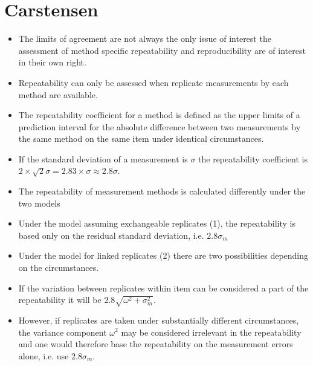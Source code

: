 \documentclass[12pt, a4paper]{article}
\begin{document}
\section{Carstensen}
\begin{itemize}
	\item The limits of agreement are not always the only issue of
	interest  the assessment of method specific repeatability and
	reproducibility are of interest in their own right.
	
	\item Repeatability can only be assessed when replicate
	measurements by each method are available.
	
	\item The repeatability coefficient for a method is defined as the
	upper limits of a prediction interval for the absolute difference
	between two measurements by the same method on the same item under
	identical circumstances.
	
	\item If the standard deviation of a measurement is $\sigma$ the
	repeatability coefficient is $2\times\sqrt{2} \sigma = 2.83\times
	\sigma \approx 2.8 \sigma$.
	
	
	\item The repeatability of measurement methods is calculated
	differently under the two models \item Under the model assuming
	exchangeable replicates (1), the repeatability is based only on
	the residual standard deviation, i.e. $2.8\sigma_m$
	
	
	\item Under the model for linked replicates (2) there are two
	possibilities depending on the circumstances.
	
	\item If the variation between replicates within item can be
	considered a part of the repeatability it will be $2.8 \sqrt{
		\omega^2 + \sigma^2_m}$.
	
	\item However, if replicates are taken under substantially
	different circumstances, the variance component $\omega^2$ may be
	considered irrelevant in the repeatability and one would therefore
	base the repeatability on the measurement errors alone, i.e. use
	$2.8 \sigma_m$.
	\end{itemize}
	

	
% 
\end{document}
